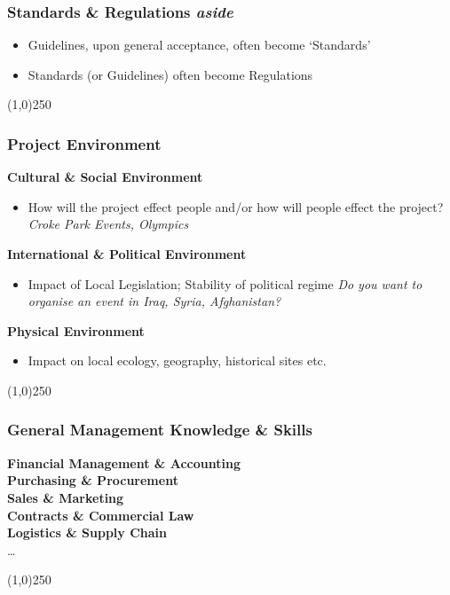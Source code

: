 \begin{frame}
\frametitle{Standards \& Regulations \hfill \textit{aside}}
\begin{itemize}
\item Guidelines, upon general acceptance, often become `Standards'
\item Standards (or Guidelines) often become Regulations
\end{itemize}
\end{frame}
\begin{center}\line(1,0){250}\end{center}



\begin{frame}
\frametitle{Project Environment}
\textbf{Cultural \& Social Environment}\\
\begin{itemize}
	\item How will the project effect people and/or how will people effect the project? \textit{Croke Park Events, Olympics}
\end{itemize}
\textbf{International \& Political Environment}\\
\begin{itemize}
	\item Impact of Local Legislation; Stability of political regime \textit{Do you want to organise an event in Iraq, Syria, Afghanistan?}
\end{itemize}
\textbf{Physical Environment }\\
\begin{itemize}
	\item Impact on local ecology, geography, historical sites etc. 
\end{itemize}
\end{frame}
\begin{center}\line(1,0){250}\end{center}



\begin{frame}
\frametitle{General Management Knowledge \& Skills}
\textbf{Financial Management \& Accounting}\\
\textbf{Purchasing \& Procurement}\\
\textbf{Sales \& Marketing}\\
\textbf{Contracts \& Commercial Law}\\
\textbf{Logistics \& Supply Chain}\\
\ldots 
\end{frame}
\begin{center}\line(1,0){250}\end{center}



